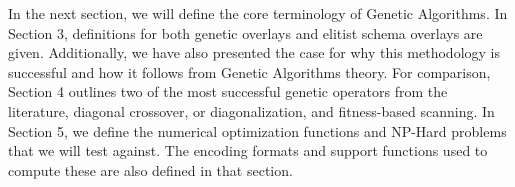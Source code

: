In the next section, we will define the core terminology of Genetic Algorithms. In Section 3, definitions for both genetic overlays and elitist schema overlays are given. Additionally, we have also presented the case for why this methodology is successful and how it follows from Genetic Algorithms theory. For comparison, Section 4 outlines two of the most successful genetic operators from the literature, diagonal crossover, or diagonalization, and fitness-based scanning. In Section 5, we define the numerical optimization functions and NP-Hard problems that we will test against. The encoding formats and support functions used to compute these are also defined in that section.
